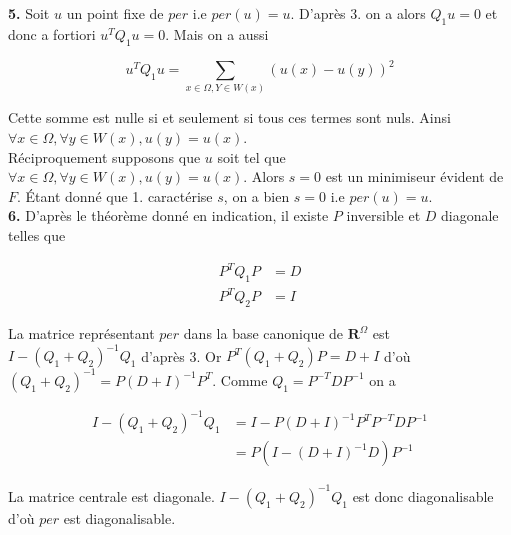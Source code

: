 \documentclass[a4paper, 11pt]{article}
\begin{document}
\textbf{5.} Soit $u$ un point fixe de $per$ i.e $per(u) = u$. D'après 3. on a alors $Q_1u=0$ et donc a fortiori
$u^TQ_1u=0$. Mais on a aussi

\begin{equation*}
u^TQ_1u = \sum_{x \in \Omega, Y \in W(x)} \left( u(x) - u(y) \right)^2
\end{equation*}

Cette somme est nulle si et seulement si tous ces termes sont nuls. Ainsi $\forall x \in \Omega, \forall y \in W(x),
u(y)=u(x)$. \\

Réciproquement supposons que $u$ soit tel que $\forall x \in \Omega, \forall y \in W(x), u(y)=u(x)$. Alors $s=0$ est
un minimiseur évident de $F$. Étant donné que 1. caractérise $s$, on a bien $s=0$ i.e $per(u)=u$. \\

\textbf{6.} D'après le théorème donné en indication, il existe $P$ inversible et $D$ diagonale telles que

\begin{align*}
  P^TQ_1P &= D \\
  P^TQ_2P &= I
\end{align*}

La matrice représentant $per$ dans la base canonique de $\mathbf{R}^{\Omega}$ est $I-(Q_1+Q_2)^{-1}Q_1$ d'après 3. Or
$P^T(Q_1+Q_2)P = D+I$ d'où $(Q_1+Q_2)^{-1} = P(D+I)^{-1}P^T$. Comme $Q_1 = P^{-T}DP^{-1}$ on a

\begin{align*}
  I-(Q_1+Q_2)^{-1}Q_1 &= I - P(D+I)^{-1}P^T P^{-T}DP^{-1}\\
    &= P(I - (D+I)^{-1}D)P^{-1}
\end{align*}

La matrice centrale est diagonale.  $I-(Q_1+Q_2)^{-1}Q_1$  est donc diagonalisable d'où $per$ est diagonalisable.\\
\end{document}
